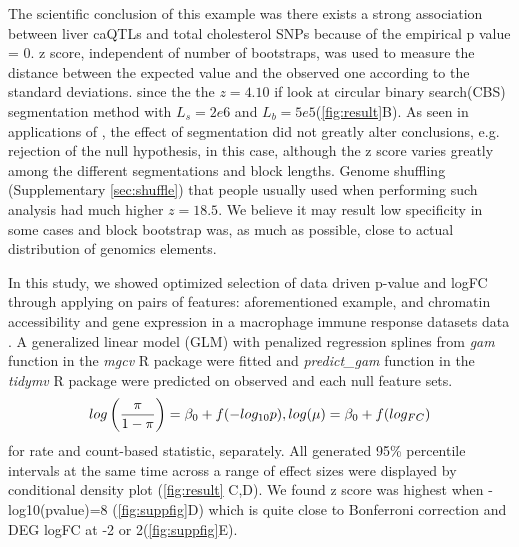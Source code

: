 The scientific conclusion of this example was there exists a strong association between liver caQTLs and total cholesterol SNPs because of the empirical p value = 0. z score, independent of number of bootstraps, was used to measure the distance between the expected value and the observed one according to the standard deviations.
since the the $z = 4.10$ if look at circular binary search(CBS) \citep{cbs} segmentation method with $L_s = 2e6$ and $L_b=5e5$(\cref{fig:result}B). 
As seen in applications of \citet{bickel2010subsampling}, the effect of segmentation did not greatly alter conclusions, e.g. rejection of the null hypothesis, in this case, although the z score varies greatly among the different segmentations and block lengths.
Genome shuffling (Supplementary \cref{sec:shuffle}) that people usually used when performing such analysis had much higher $z = 18.5$. We believe it may result low specificity in some cases and block bootstrap was, as much as possible, close to actual distribution of genomics elements. 

In this study, we showed optimized selection of data driven p-value and logFC through applying \bootranges on pairs of features: 
aforementioned example, and chromatin accessibility and gene expression in a macrophage immune response datasets data \citep{alasoo2018shared}. A generalized linear model (GLM) with penalized regression splines from \textit{gam} function in the \emph{mgcv} R package were fitted and \textit{predict\_gam} function in the \emph{tidymv} R package were predicted on observed and each null feature sets. 
$$
\setlength{\abovedisplayskip}{3pt}
\setlength{\belowdisplayskip}{3pt}
log \left( \frac{\pi}{1-\pi} \right) = \beta_0  + f (-log_{10}p), log(\mu) = \beta_0 + f (log_{FC})
$$ 
for rate and count-based statistic, separately. 
All generated 95\% percentile intervals at the same time across a range of effect sizes were displayed by conditional density plot (\cref{fig:result} C,D). We found z score was highest when -log10(pvalue)=8 (\cref{fig:suppfig}D) which is quite close to Bonferroni correction and DEG logFC at -2 or 2(\cref{fig:suppfig}E). 

